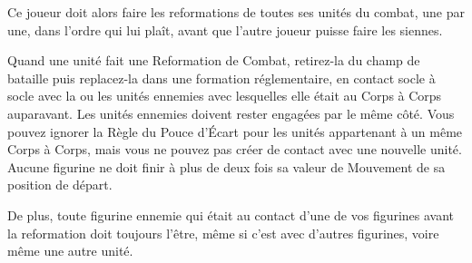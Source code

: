  Ce joueur doit alors faire les reformations de toutes ses unités du combat, une par une, dans l'ordre qui lui plaît, avant que l'autre joueur puisse faire les siennes.

Quand une unité fait une Reformation de Combat, retirez-la du champ de bataille puis replacez-la dans une formation réglementaire, en contact socle à socle avec la ou les unités ennemies avec lesquelles elle était au Corps à Corps auparavant. Les unités ennemies doivent rester engagées par le même côté. Vous pouvez ignorer la Règle du Pouce d'Écart pour les unités appartenant à un même Corps à Corps, mais vous ne pouvez pas créer de contact avec une nouvelle unité. Aucune figurine ne doit finir à plus de deux fois sa valeur de Mouvement de sa position de départ.

 De plus, toute figurine ennemie qui était au contact d'une de vos figurines avant la reformation doit toujours l'être, même si c'est avec d'autres figurines, voire même une autre unité.

